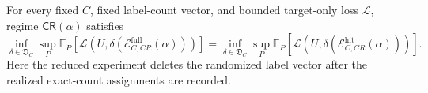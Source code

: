 For every fixed \(C\), fixed label-count vector, and bounded target-only loss \(\mathcal L\), regime \(\mathsf{CR}(\alpha)\) satisfies \[\inf_{\delta\in\mathfrak D_C}\sup_P\mathbb E_P[\mathcal L(U,\delta(\mathcal E_{C,CR}^{\mathrm{full}}(\alpha)))] = \inf_{\delta\in\mathfrak D_C}\sup_P\mathbb E_P[\mathcal L(U,\delta(\mathcal E_{C,CR}^{\mathrm{hit}}(\alpha)))].\] Here the reduced experiment deletes the randomized label vector after the realized exact-count assignments are recorded.